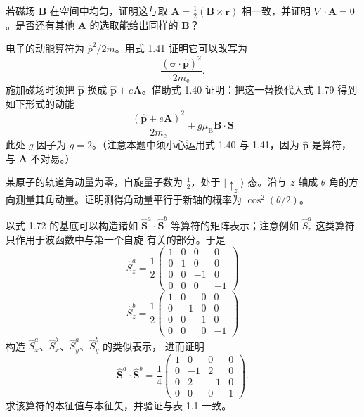  若磁场 $\mathbf{B}$ 在空间中均匀，证明这与取 $\mathbf{A}=\frac{1}{2}(\mathbf{B}\times\mathbf{r})$ 相一致，并证明 $\nabla\cdot\mathbf{A}=0$。是否还有其他 $\mathbf{A}$ 的选取能给出同样的 $\mathbf{B}$？

 电子的动能算符为 $\hat{p}^{2}/2m$。用式 1.41 证明它可以改写为
\begin{equation*}
\frac{(\boldsymbol{\sigma}\cdot\hat{\mathbf{p}})^{2}}{2m_{\mathrm{e}}}.\tag{1.79}
\end{equation*}
施加磁场时须把 $\hat{\mathbf{p}}$ 换成 $\hat{\mathbf{p}}+e\mathbf{A}$。借助式 1.40
证明：把这一替换代入式 1.79 得到如下形式的动能
\begin{equation*}
\frac{(\hat{\mathbf{p}}+e\mathbf{A})^{2}}{2m_{\mathrm{e}}} + g\mu_{\mathrm{B}}\mathbf{B}\cdot\mathbf{S}\tag{1.80}
\end{equation*}
此处 $g$ 因子为 $g=2$。（注意本题中须小心运用式 1.40 与 1.41，因为 $\hat{\mathbf{p}}$
是算符，与 $\mathbf{A}$ 不对易。）

 某原子的轨道角动量为零，自旋量子数为 $\frac{1}{2}$，处于 $|\!\uparrow_z\rangle$
态。沿与 $z$ 轴成 $\theta$ 角的方向测量其角动量。证明测得角动量平行于新轴的概率为
$\cos^{2}(\theta/2)$。

 以式 1.72 的基底可以构造诸如 $\hat{\mathbf{S}}^{a}\cdot\hat{\mathbf{S}}^{b}$
等算符的矩阵表示；注意例如 $\hat{S}_z^{a}$ 这类算符只作用于波函数中与第一个自旋
有关的部分。于是
\begin{equation*}
\hat{S}_z^{a} = \frac{1}{2}\begin{pmatrix} 1 & 0 & 0 & 0\\ 0 & 1 & 0 & 0\\ 0 & 0 & -1 & 0\\ 0 & 0 & 0 & -1 \end{pmatrix}\tag{1.81}
\end{equation*}
\begin{equation*}
\hat{S}_z^{b} = \frac{1}{2}\begin{pmatrix} 1 & 0 & 0 & 0\\ 0 & -1 & 0 & 0\\ 0 & 0 & 1 & 0\\ 0 & 0 & 0 & -1 \end{pmatrix}\tag{1.82}
\end{equation*}
构造 $\hat{S}_x^{a}$、$\hat{S}_x^{b}$、$\hat{S}_y^{a}$、$\hat{S}_y^{b}$ 的类似表示，
进而证明
\begin{equation*}
\hat{\mathbf{S}}^{a}\cdot\hat{\mathbf{S}}^{b} = \frac{1}{4}\begin{pmatrix} 1 & 0 & 0 & 0\\ 0 & -1 & 2 & 0\\ 0 & 2 & -1 & 0\\ 0 & 0 & 0 & 1 \end{pmatrix}.\tag{1.83}
\end{equation*}
求该算符的本征值与本征矢，并验证与表 1.1 一致。

